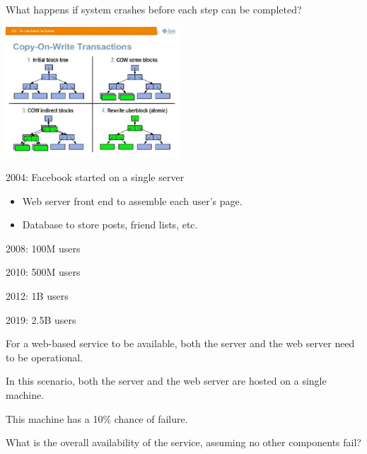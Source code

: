 \begin{slide}

    
    What happens if system crashes before each step can be completed?
    \bigskip

    \includegraphics[width=65mm]{zfs.jpg}

\end{slide}

\begin{slide}


    2004: Facebook started on a single server
    \begin{itemize}
        \item Web server front end to assemble each user’s page. 
        \item Database to store posts, friend lists, etc.
    \end{itemize}
    \medskip

    2008: 100M users
    \medskip

    2010: 500M users
    \medskip

    2012: 1B users
    \medskip

    2019: 2.5B users
    \medskip

\end{slide}

\begin{slide}


    For a web-based service to be available, both the server and the web server need to be operational.
    \bigskip

    In this scenario, both the server and the web server are hosted on a single machine.
    \bigskip

    This machine has a 10\% chance of failure.
    \bigskip

    What is the overall availability of the service, assuming no other components fail?

\end{slide}

